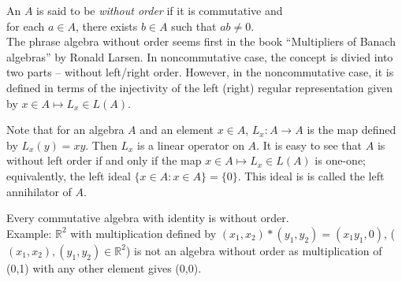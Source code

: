 \documentclass[12pt]{article}
\begin{document}
An  $A$ is said to be  {\em without order} if it is commutative and \\for each $a \in A$, there exists $b \in A$ such that $ab \ne 0$.\\

The phrase algebra without order seems first in the book ``Multipliers of Banach algebras'' by Ronald Larsen. In noncommutative case, the concept is divied into two parts -- without left/right order. However, in the noncommutative case, it is defined in terms of the injectivity of the left (right) regular representation given by $x \in A \mapsto L_x \in L(A)$. 

Note that for an algebra $A$ and an element $x \in A$, $L_x : A \to A$ is the map defined by $L_x(y) = xy$. Then $L_x$ is a linear operator on $A$. It is easy to see that $A$ is without left order if and only if the map $x \in A \mapsto L_x \in L(A)$ is one-one; equivalently, the left ideal $\{x \in A : x \in A\} = \{0\}$. This ideal is is called the left annihilator of $A$. 

Every commutative algebra with identity is without order.\\

Example: $\mathbb{R}^2$ with multiplication defined by $(x_1,x_2) * (y_1,y_2) = (x_1y_1,0)$, ($(x_1,x_2), (y_1,y_2) \in \mathbb{R}^2$) is not an algebra without order as multiplication of (0,1) with any other element gives (0,0).
\end{document}
